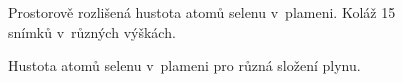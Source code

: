 \begin{figure}[htp]
	\centering
	
	\caption{Prostorově rozlišená hustota atomů selenu v~plameni.
		Koláž 15 snímků v~různých výškách.}
	\label{fig:lif-vertical-concentration-700+300}
\end{figure}

\begin{figure}[htp]
	\centering
	
	\caption{Hustota atomů selenu v~plameni pro různá složení plynu.}
	\label{fig:lif-vertical-concentration-compositions}
\end{figure}
